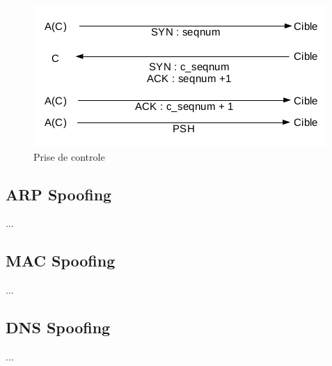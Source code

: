 \begin{figure}[hbtp]
\caption{Prise de controle}
\centering
\includegraphics[scale=1]{../images/ip-spoofing-control.png}
\end{figure}

\subsection{ARP Spoofing}\label{vulnerabilites:reseau:spoofing:arp}

...

\subsection{MAC Spoofing}\label{vulnerabilites:reseau:spoofing:mac}

...

\subsection{DNS Spoofing}\label{vulnerabilites:reseau:spoofing:dns}

...

\endinput
